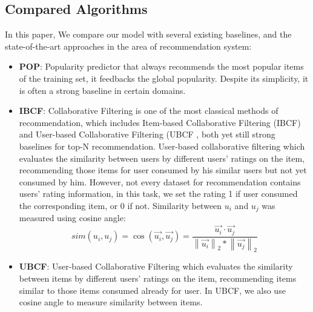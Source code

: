 \documentclass[runningheads]{llncs}
\begin{document}
\subsection{Compared Algorithms}
In this paper, We compare our model with several existing baselines, and the state-of-the-art approaches in the area of recommendation system:

 \begin{itemize}
\item \textbf{POP}: Popularity predictor that always recommends the most popular items of the training set, it feedbacks the global popularity. Despite its simplicity, it is often a strong baseline in certain domains.
\item \textbf{IBCF}: Collaborative Filtering is one of the most classical methods of recommendation, which includes Item-based Collaborative Filtering (IBCF) \cite{sarwar2001item}and User-based Collaborative Filtering (UBCF \cite{Resnick:1994:GOA:192844.192905}, both yet still strong baselines for top-N recommendation. User-based collaborative filtering which evaluates the similarity between users by different users' ratings on the item, recommending those items for user consumed by his similar users but not yet consumed by him. However, not every dataset for recommendation contains users' rating information, in this task, we set the rating 1 if user consumed the corresponding item, or 0 if not. Similarity between $u_{i}$ and $u_{j}$ was measured using cosine angle:
\begin{equation}
sim(u_{i},u_{j})=\cos (\vec{u_{i}},\vec{u_{j}})=\frac{\vec{u_{i}}\cdot \vec{u_{j}}}{\left \| \vec{u_{i}} \right \|_{2}\ast \left \| \vec{u_{j}} \right \|_{2}}
\end{equation}

\item \textbf{UBCF}: User-based Collaborative Filtering which evaluates the similarity between items by different users' ratings on the item, recommending items similar to those items consumed already for user. In UBCF, we also use cosine angle to measure similarity between items.
\end{itemize}
\end{document}
